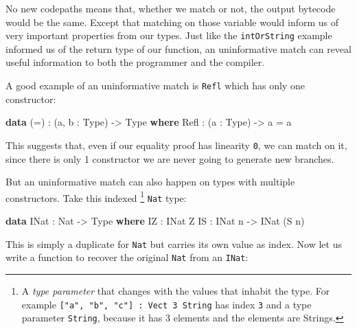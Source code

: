 \documentclass[
]{article}
\newenvironment{Shaded}{}{}
\newcommand{\DataTypeTok}[1]{\textcolor[rgb]{0.56,0.13,0.00}{#1}}
\newcommand{\KeywordTok}[1]{\textcolor[rgb]{0.00,0.44,0.13}{\textbf{#1}}}
\newcommand{\NormalTok}[1]{#1}
\newcommand{\OperatorTok}[1]{\textcolor[rgb]{0.40,0.40,0.40}{#1}}
\newcommand{\OtherTok}[1]{\textcolor[rgb]{0.00,0.44,0.13}{#1}}
\begin{document}
No new codepaths means that, whether we match or not, the output
bytecode would be the same. Except that matching on those variable would
inform us of very important properties from our types. Just like the
\texttt{intOrString} example informed us of the return type of our
function, an uninformative match can reveal useful information to both
the programmer and the compiler.

A good example of an uninformative match is \texttt{Refl} which has only
one constructor:

\begin{Shaded}
\begin{Highlighting}[]
\KeywordTok{data}\NormalTok{ (}\OtherTok{=}\NormalTok{) }\OperatorTok{:}\NormalTok{ (a, b }\OperatorTok{:} \DataTypeTok{Type}\NormalTok{) }\OtherTok{{-}\textgreater{}} \DataTypeTok{Type} \KeywordTok{where}
  \DataTypeTok{Refl} \OperatorTok{:}\NormalTok{ (a }\OperatorTok{:} \DataTypeTok{Type}\NormalTok{) }\OtherTok{{-}\textgreater{}}\NormalTok{ a }\OtherTok{=}\NormalTok{ a}
\end{Highlighting}
\end{Shaded}

This suggests that, even if our equality proof has linearity \texttt{0},
we can match on it, since there is only 1 constructor we are never going
to generate new branches.

But an uninformative match can also happen on types with multiple
constructors. Take this indexed \footnote{A \emph{type parameter} that
  changes with the values that inhabit the type. For example
  \texttt{{[}"a",\ "b",\ "c"{]}\ :\ Vect\ 3\ String} has index
  \texttt{3} and a type parameter \texttt{String}, because it has 3
  elements and the elements are Strings.} \texttt{Nat} type:

\begin{Shaded}
\begin{Highlighting}[]
\KeywordTok{data} \DataTypeTok{INat} \OperatorTok{:} \DataTypeTok{Nat} \OtherTok{{-}\textgreater{}} \DataTypeTok{Type} \KeywordTok{where}
  \DataTypeTok{IZ} \OperatorTok{:} \DataTypeTok{INat} \DataTypeTok{Z}
  \DataTypeTok{IS} \OperatorTok{:} \DataTypeTok{INat}\NormalTok{ n }\OtherTok{{-}\textgreater{}} \DataTypeTok{INat}\NormalTok{ (}\DataTypeTok{S}\NormalTok{ n)}
\end{Highlighting}
\end{Shaded}

This is simply a duplicate for \texttt{Nat} but carries its own value as
index. Now let us write a function to recover the original \texttt{Nat}
from an \texttt{INat}:
\end{document}
